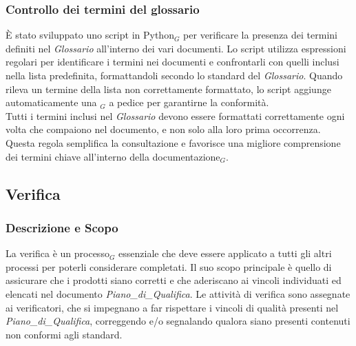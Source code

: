 \documentclass[10pt]{article}
\begin{document}
\begin{justify}
    \subsubsection{Controllo dei termini del glossario}
    È stato sviluppato uno script in Python$_G$ per verificare la presenza dei termini definiti nel \textit{Glossario} all'interno dei vari documenti. Lo script utilizza espressioni regolari per identificare i termini nei documenti e confrontarli con quelli inclusi nella lista predefinita, formattandoli secondo lo standard del \textit{Glossario}. Quando rileva un termine della lista non correttamente formattato, lo script aggiunge automaticamente una $_G$ a pedice per garantirne la conformità.\\
    Tutti i termini inclusi nel \textit{Glossario} devono essere formattati correttamente ogni volta che compaiono nel documento, e non solo alla loro prima occorrenza. Questa regola semplifica la consultazione e favorisce una migliore comprensione dei termini chiave all'interno della documentazione$_G$.

    \subsection{Verifica}
    \label{verifica}
    \subsubsection{Descrizione e Scopo} 
    La verifica è un processo$_G$ essenziale che deve essere applicato a tutti gli altri processi per poterli considerare completati. Il suo scopo principale è quello di assicurare che i prodotti siano corretti e che aderiscano ai vincoli individuati ed elencati nel documento \textit{Piano\_di\_Qualifica}. Le attività di verifica sono assegnate ai verificatori, che si impegnano a far rispettare i vincoli di qualità presenti nel \textit{Piano\_di\_Qualifica}, correggendo e/o segnalando qualora siano presenti contenuti non conformi agli standard.

\end{justify}
\end{document}
